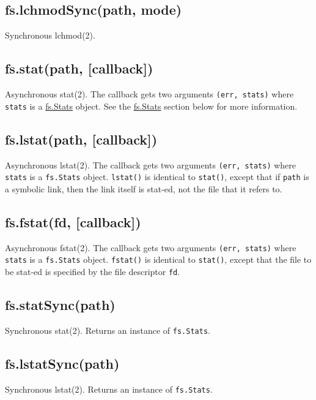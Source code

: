 \subsection{fs.lchmodSync(path, mode)}

Synchronous lchmod(2).

\subsection{fs.stat(path, {[}callback{]})}

Asynchronous stat(2). The callback gets two arguments
\texttt{(err, stats)} where \texttt{stats} is a
\hyperref[fs\_class\_fs\_stats]{fs.Stats} object. See the
\hyperref[fs\_class\_fs\_stats]{fs.Stats} section below for more
information.

\subsection{fs.lstat(path, {[}callback{]})}

Asynchronous lstat(2). The callback gets two arguments
\texttt{(err, stats)} where \texttt{stats} is a \texttt{fs.Stats}
object. \texttt{lstat()} is identical to \texttt{stat()}, except that if
\texttt{path} is a symbolic link, then the link itself is stat-ed, not
the file that it refers to.

\subsection{fs.fstat(fd, {[}callback{]})}

Asynchronous fstat(2). The callback gets two arguments
\texttt{(err, stats)} where \texttt{stats} is a \texttt{fs.Stats}
object. \texttt{fstat()} is identical to \texttt{stat()}, except that
the file to be stat-ed is specified by the file descriptor \texttt{fd}.

\subsection{fs.statSync(path)}

Synchronous stat(2). Returns an instance of \texttt{fs.Stats}.

\subsection{fs.lstatSync(path)}

Synchronous lstat(2). Returns an instance of \texttt{fs.Stats}.

